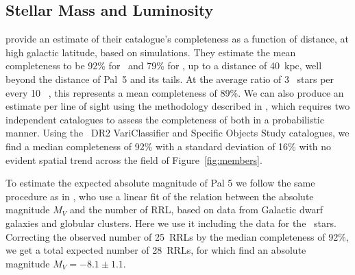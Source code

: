 \documentclass[twocolumn]{aastex63}
\begin{document}
\subsection{Stellar Mass and Luminosity}


\citet{Sesar2017b} provide an estimate of their catalogue's completeness as a function of distance, at high galactic latitude, based on simulations. They estimate the mean completeness to be 92\% for \rrab~and 79\% for \rrc, up to a distance of 40~kpc, well beyond the distance of Pal~5 and its tails. At the average ratio of 3 \rrc~stars per every 10 \rrab~\citep{Layden1995}, this represents a mean completeness of 89\%. We can also produce an estimate per line of sight using the methodology described in \citet{Rybizki2018}, which requires two independent catalogues to assess the completeness of both in a probabilistic manner. Using the \Gaia~DR2 VariClassifier \citet{Holl2018,Rimoldini2018} and Specific Objects Study \citep{Clementini2018} catalogues, we find a median completeness of 92\% with a standard deviation of 16\%  with no evident spatial trend across the field of Figure~\ref{fig:members}.


To estimate the expected absolute magnitude of Pal 5 we follow the same procedure as in \citet{Mateu2018}, who use a linear fit of the relation between the absolute magnitude $M_V$ and the number of \typeab RRL, based on data from Galactic dwarf galaxies and globular clusters. Here we use it including the data for the \typec~stars.
Correcting the observed number of 25~RRLs by the median completeness of 92\%, we get a total expected number of 28~RRLs, for which find an absolute magnitude $M_V=-8.1\pm 1.1$.

\end{document}
